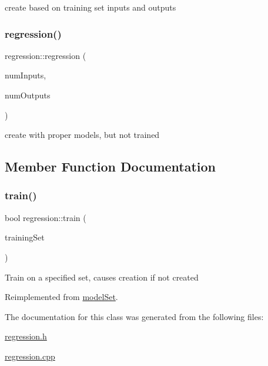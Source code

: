 create based on training set inputs and outputs \mbox{\label{classregression_a9d38dcda0e5c99caf0faf85f98a5ebb3}} 
\subsubsection{\texorpdfstring{regression()}{regression()}\hspace{0.1cm}{\footnotesize\ttfamily [3/3]}}
{\footnotesize\ttfamily regression\+::regression (\begin{DoxyParamCaption}\item[{int}]{num\+Inputs,  }\item[{int}]{num\+Outputs }\end{DoxyParamCaption})}

create with proper models, but not trained 

\subsection{Member Function Documentation}
\mbox{\label{classregression_ae45d7dbf24cab75202d966d116829813}} 
\subsubsection{\texorpdfstring{train()}{train()}}
{\footnotesize\ttfamily bool regression\+::train (\begin{DoxyParamCaption}\item[{std\+::vector$<$ \hyperlink{structtraining_example}{training\+Example} $>$}]{training\+Set }\end{DoxyParamCaption})\hspace{0.3cm}{\ttfamily [virtual]}}

Train on a specified set, causes creation if not created 

Reimplemented from \hyperlink{classmodel_set_ab0b16ec988c8077158de1c3d8986df03}{model\+Set}.



The documentation for this class was generated from the following files\+:\begin{DoxyCompactItemize}
\item 
\hyperlink{regression_8h}{regression.\+h}\item 
\hyperlink{regression_8cpp}{regression.\+cpp}\end{DoxyCompactItemize}
